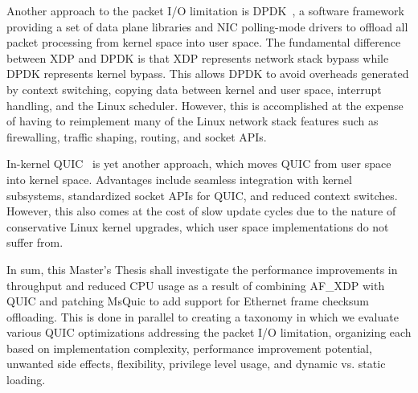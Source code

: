 \documentclass[NET,a4paper,12pt,english]{netforms}
\begin{document}
Another approach to the packet I/O limitation is DPDK~\cite{dpdk}, a software framework providing a set of data plane libraries and NIC polling-mode drivers to offload all packet processing from kernel space into user space. The fundamental difference between XDP and DPDK is that XDP represents network stack bypass while DPDK represents kernel bypass. This allows DPDK to avoid overheads generated by context switching, copying data between kernel and user space, interrupt handling, and the Linux scheduler. However, this is accomplished at the expense of having to reimplement many of the Linux network stack features such as firewalling, traffic shaping, routing, and socket APIs.

In-kernel QUIC~\cite{quic_lxin} is yet another approach, which moves QUIC from user space into kernel space. Advantages include seamless integration with kernel subsystems, standardized socket APIs for QUIC, and reduced context switches. However, this also comes at the cost of slow update cycles due to the nature of conservative Linux kernel upgrades, which user space implementations do not suffer from.

In sum, this Master's Thesis shall investigate the performance improvements in throughput and reduced CPU usage as a result of combining AF\_XDP with QUIC and patching MsQuic to add support for Ethernet frame checksum offloading. This is done in parallel to creating a taxonomy in which we evaluate various QUIC optimizations addressing the packet I/O limitation, organizing each based on implementation complexity, performance improvement potential, unwanted side effects, flexibility, privilege level usage, and dynamic vs. static loading.
\end{document}
